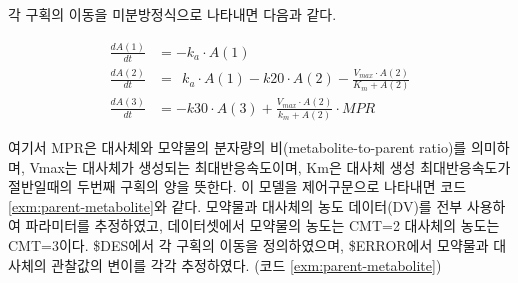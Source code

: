 \documentclass[
  10pt,
  krantz2,
  a4paper]{krantz}
\theoremstyle{definition}
\theoremstyle{definition}
\theoremstyle{definition}
\theoremstyle{remark}
\begin{document}
각 구획의 이동을 미분방정식으로 나타내면 다음과 같다.

\begin{equation} 
\begin{split}
  \frac{dA(1)}{dt} & = -k_a \cdot A(1)  \\
  \frac{dA(2)}{dt} & = \ \ k_a \cdot A(1) - k20 \cdot A(2) - \frac{V_{max} \cdot A(2)}{K_m + A(2)} \\
  \frac{dA(3)}{dt} & = -k30 \cdot A(3) + \frac{V_{max} \cdot A(2)}{k_m + A(2)} \cdot MPR
\end{split}
\label{eq:comp-mpr}
\end{equation}

여기서 MPR은 대사체와 모약물의 분자량의 비(metabolite-to-parent ratio)를 의미하며, Vmax는 대사체가 생성되는 최대반응속도이며, Km은 대사체 생성 최대반응속도가 절반일때의 두번째 구획의 양을 뜻한다. 이 모델을 제어구문으로 나타내면 코드 \ref{exm:parent-metabolite}와 같다. 모약물과 대사체의 농도 데이터(DV)를 전부 사용하여 파라미터를 추정하였고, 데이터셋에서 모약물의 농도는 CMT=2 대사체의 농도는 CMT=3이다. \$DES에서 각 구획의 이동을 정의하였으며, \$ERROR에서 모약물과 대사체의 관찰값의 변이를 각각 추정하였다. (코드 \ref{exm:parent-metabolite})
\end{document}
